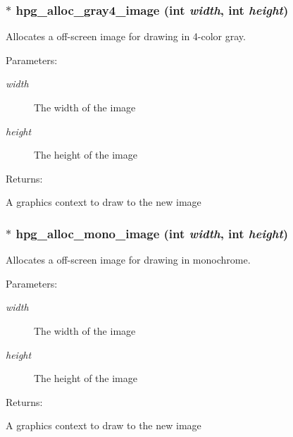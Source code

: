 \subsubsection{$\ast$ hpg\_\-alloc\_\-gray4\_\-image (int {\em width}, int {\em height})}\label{hpgraphics_8h_a76}


Allocates a off-screen image for drawing in 4-color gray.

\begin{Desc}
\item[Parameters: ]\par
\begin{description}
\item[{\em 
width}]The width of the image \item[{\em 
height}]The height of the image \end{description}
\end{Desc}
\begin{Desc}
\item[Returns: ]\par
A graphics context to draw to the new image \end{Desc}
\subsubsection{$\ast$ hpg\_\-alloc\_\-mono\_\-image (int {\em width}, int {\em height})}\label{hpgraphics_8h_a75}


Allocates a off-screen image for drawing in monochrome.

\begin{Desc}
\item[Parameters: ]\par
\begin{description}
\item[{\em 
width}]The width of the image \item[{\em 
height}]The height of the image \end{description}
\end{Desc}
\begin{Desc}
\item[Returns: ]\par
A graphics context to draw to the new image \end{Desc}
